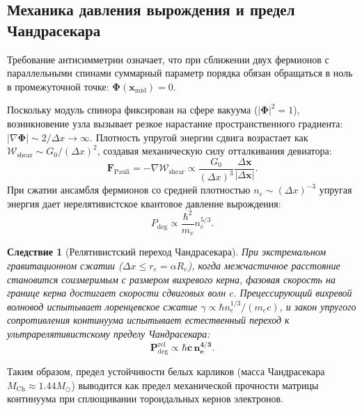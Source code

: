 \documentclass[11pt,a4paper]{article}
\newtheorem{corollary}[theorem]{Следствие}
\theoremstyle{definition}
\theoremstyle{remark}
\begin{document}
\subsection{Механика давления вырождения и предел Чандрасекара}
Требование антисимметрии означает, что при сближении двух фермионов с параллельными спинами суммарный параметр порядка обязан обращаться в ноль в промежуточной точке: $\boldsymbol{\Phi}(\mathbf{x}_{\mathrm{mid}}) = 0$.

Поскольку модуль спинора фиксирован на сфере вакуума ($|\boldsymbol{\Phi}|^2 = 1$), возникновение узла вызывает резкое нарастание пространственного градиента: $|\nabla \boldsymbol{\Phi}| \sim 2 / \Delta x \to \infty$. Плотность упругой энергии сдвига возрастает как $\mathcal{W}_{\mathrm{shear}} \sim G_0 / (\Delta x)^2$, создавая механическую силу отталкивания девиатора:
\begin{equation}
    \mathbf{F}_{\mathrm{Pauli}} = -\nabla \mathcal{W}_{\mathrm{shear}} \propto \frac{G_0}{(\Delta x)^3} \frac{\Delta \mathbf{x}}{|\Delta \mathbf{x}|}.
\end{equation}
При сжатии ансамбля фермионов со средней плотностью $n_e \sim (\Delta x)^{-3}$ упругая энергия дает нерелятивистское квантовое давление вырождения:
\begin{equation}
    P_{\mathrm{deg}} \propto \frac{\hbar^2}{m_e} n_e^{5/3}.
    \label{eq:fermi_pressure_nonrel}
\end{equation}

\begin{corollary}[Релятивистский переход Чандрасекара]
При экстремальном гравитационном сжатии ($\Delta x \le r_e = \alpha R_e$), когда межчастичное расстояние становится соизмеримым с размером вихревого керна, фазовая скорость на границе керна достигает скорости сдвиговых волн $c$. Прецессирующий вихревой волновод испытывает лоренцевское сжатие $\gamma \propto \hbar n_e^{1/3} / (m_e c)$, и закон упругого сопротивления континуума испытывает естественный переход к ультрарелятивистскому пределу Чандрасекара:
\begin{equation}
    \mathbf{P_{\mathrm{deg}}^{\mathrm{rel}} \propto \hbar c \, n_e^{4/3}}.
    \label{eq:chandrasekhar_pressure}
\end{equation}
\end{corollary}
Таким образом, предел устойчивости белых карликов (масса Чандрасекара $M_{\mathrm{Ch}} \approx 1.44 M_\odot$) выводится как предел механической прочности матрицы континуума при сплющивании тороидальных кернов электронов.
\end{document}
